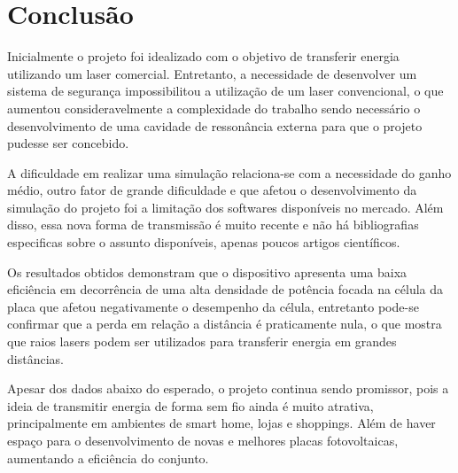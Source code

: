 \chapter{Conclusão}

Inicialmente o projeto foi idealizado com o objetivo de transferir energia utilizando um laser comercial. Entretanto, a necessidade de desenvolver um sistema de segurança impossibilitou a utilização de um laser convencional, o que aumentou consideravelmente a complexidade do trabalho sendo necessário o desenvolvimento de uma cavidade de ressonância externa para que o projeto pudesse ser concebido.

A dificuldade em realizar uma simulação relaciona-se com a necessidade do ganho médio, outro fator de grande dificuldade e que afetou o desenvolvimento da simulação do projeto foi a limitação dos softwares disponíveis no mercado. Além disso, essa nova forma de transmissão é muito recente e não há bibliografias especificas sobre o assunto disponíveis, apenas poucos artigos científicos.

Os resultados obtidos demonstram que o dispositivo apresenta uma baixa eficiência em decorrência de uma alta densidade de potência focada na célula da placa que afetou negativamente o desempenho da célula, entretanto pode-se confirmar que a perda em relação a distância é praticamente nula, o que mostra que raios lasers podem ser utilizados para transferir energia em grandes distâncias.

Apesar dos dados abaixo do esperado, o projeto continua sendo promissor, pois a ideia de transmitir energia de forma sem fio ainda é muito atrativa, principalmente em ambientes de smart home, lojas e shoppings. Além de haver espaço para o desenvolvimento de novas e melhores placas fotovoltaicas, aumentando a eficiência do conjunto.